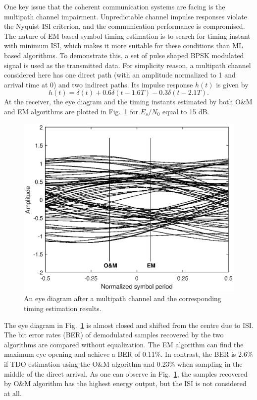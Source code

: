 \documentclass[12pt, draftclsnofoot, onecolumn]{IEEEtran}
\begin{document}
One key issue that the coherent communication systems are facing is the multipath channel impairment.
Unpredictable channel impulse responses violate the Nyquist ISI criterion, and the communication performance is compromised.
The nature of EM based symbol timing estimation is to search for timing instant with minimum ISI, which makes it more suitable for these conditions than ML based algorithms.
To demonstrate this, a set of pulse shaped BPSK modulated signal is used as the transmitted data.
For simplicity reason, a multipath channel considered here has one direct path (with an amplitude normalized to 1 and arrival time at 0) and two indirect paths.
Its impulse response $h(t)$ is given by
\begin{equation}
h(t)=\delta(t)+0.6\delta(t-1.6T)-0.3\delta(t-2.1T).
\label{eq:multi_path}
\end{equation}
At the receiver, the eye diagram and the timing instants estimated by both O\&M and EM algorithms are plotted in Fig.~\ref{fig:per_timing_isi} for \(E_s/N_0\) equal to 15 dB. 
\begin{figure}[ht]
\centering
\includegraphics[width=3 in]{pic/per_timing_multi-k.eps}
\caption{An eye diagram after a multipath channel and the corresponding timing estimation results.}
\label{fig:per_timing_isi} 
\end{figure} 

The eye diagram in Fig.~\ref{fig:per_timing_isi} is almost closed and shifted from the centre due to ISI.
The bit error rates (BER) of demodulated samples recovered by the two algorithms are compared without equalization.
The EM algorithm can find the maximum eye opening and achieve a BER of 0.11\%.
In contrast, the BER is 2.6\% if TDO estimation using the O\&M algorithm and 0.23\% when sampling in the middle of the direct arrival.
As one can observe in Fig.~\ref{fig:per_timing_isi}, the samples recovered by O\&M algorithm has the highest energy output, but the ISI is not considered at all.
\end{document}
